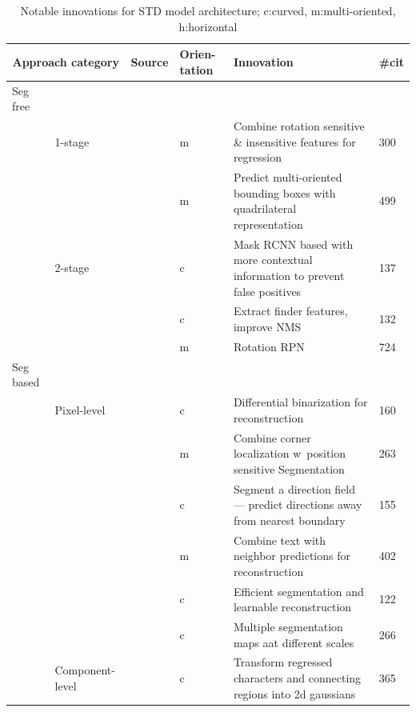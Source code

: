 \begin{table}[h]
    \centering\scriptsize
    \begin{tabular}{p{}p{}p{}p{}
            p{}p{}}
        \multicolumn{2}{c}{\textbf{Approach category}} & \textbf{Source} & \textbf{Orien-tation}
                                                       & \textbf{Innovation} & \textbf{\#cit}\\
        \toprule
         Seg free & & \\
            & 1-stage &~\cite{liao_rotation-sensitive_2018} & m & Combine rotation sensitive \&
                insensitive features for regression & 300 \\
            & &~\cite{liao_textboxes_2018} & m & Predict multi-oriented bounding boxes with
                quadrilateral representation & 499 \\
            & 2-stage &~\cite{xie_scene_2018} & c & Mask RCNN based with more contextual information
                to prevent false positives & 137 \\
            & &~\cite{dai_fused_2018} & c & Extract finder features, improve \ac{NMS} & 132 \\
            & &~\cite{ma_arbitrary-oriented_2018} & m & Rotation RPN & 724 \\
         \midrule
         Seg based & & \\
            & Pixel-level &~\cite{liao_real-time_2019} & c & Differential binarization for
                reconstruction  & 160\\
            & &~\cite{lyu_multi-oriented_2018} & m & Combine corner localization w\ position sensitive
               Segmentation & 263\\
            & &~\cite{xu_textfield_2019} & c & Segment a direction field --- predict directions away
               from nearest boundary & 155 \\
            & &~\cite{deng_pixellink_2018} & m & Combine text with neighbor predictions for
               reconstruction & 402 \\
            & &~\cite{wang_efficient_2019} & c & Efficient segmentation and learnable reconstruction
               & 122 \\
            & &~\cite{wang_shape_2019} & c & Multiple segmentation maps aat different scales & 266 \\
            & Component-level &~\cite{baek_character_2019} & c & Transform regressed characters and
               connecting regions into 2d gaussians & 365 \\
        \bottomrule
    \end{tabular}
    \caption[Notable innovations for STD model architecture]{%
        Notable innovations for STD model architecture; c:curved,
        m:multi-oriented, h:horizontal\label{tb:steps-properties}
    }
\end{table}
